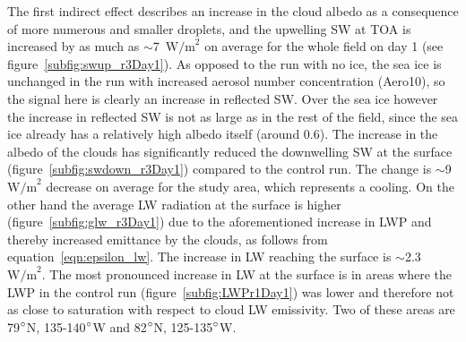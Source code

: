 The first indirect effect describes an increase in the cloud albedo as a consequence of more numerous and smaller droplets, and the upwelling SW at TOA is increased by as much as $\sim$7~$\text{W/m}^2$ on average for the whole field on day 1 (see figure~\ref{subfig:swup_r3Day1}). As opposed to the run with no ice, the sea ice is unchanged in the run with increased aerosol number concentration (Aero10), so the signal here is clearly an increase in reflected SW. Over the sea ice however the increase in reflected SW is not as large as in the rest of the field, since the sea ice already has a relatively high albedo itself (around 0.6). The increase in the albedo of the clouds has significantly reduced the downwelling SW at the surface (figure~\ref{subfig:swdown_r3Day1}) compared to the control run. The change is $\sim$9~$\text{W/m}^2$ decrease on average for the study area, which represents a cooling. On the other hand the average LW radiation at the surface is higher (figure~\ref{subfig:glw_r3Day1}) due to the aforementioned increase in LWP and thereby increased emittance by the clouds, as follows from equation~\ref{eqn:epsilon_lw}. The increase in LW reaching the surface is $\sim$2.3~$\text{W/m}^2$. The most pronounced increase in LW at the surface is in areas where the LWP in the control run (figure~\ref{subfig:LWPr1Day1}) was lower and therefore not as close to saturation with respect to cloud LW emissivity. Two of these areas are 79$\degree$N, 135-140$\degree$W and 82$\degree$N, 125-135$\degree$W. 

